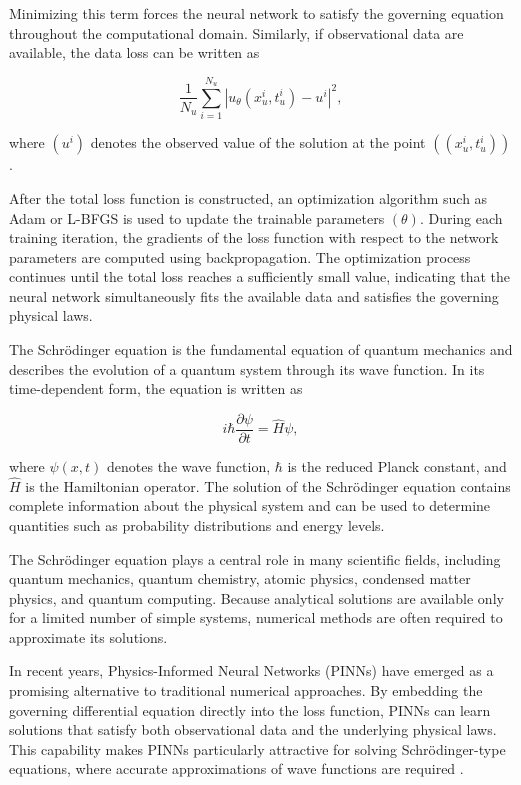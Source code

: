 \documentclass[11pt]{article}
\begin{document}
Minimizing this term forces the neural network to satisfy the 
governing equation throughout the computational domain. Similarly, 
if observational data are available, the data loss can be written as


\begin{equation}
	\frac{1}{N_u}
	\sum_{i=1}^{N_u}
	\left|
	u_\theta(x_u^i,t_u^i)-u^i
	\right|^2,
\end{equation}

where $(u^i)$ denotes the observed value of the solution at the point $((x_u^i,t_u^i))$.


After the total loss function is constructed, an optimization algorithm such 
as Adam or L-BFGS is used to update the trainable parameters $(\theta)$. 
During each training iteration, the gradients of the loss function with 
respect to the network parameters are computed using backpropagation. 
The optimization process continues until the total loss reaches a sufficiently 
small value, indicating that the neural network simultaneously fits the available 
data and satisfies the governing physical laws.


The Schrödinger equation is the fundamental equation of quantum mechanics and 
describes the evolution of a quantum system through its wave function. In its 
time-dependent form, the equation is written as

\begin{equation}
	i\hbar \frac{\partial \psi}{\partial t}
	=
	\hat{H}\psi,
\end{equation}

where $\psi(x,t)$ denotes the wave function, $\hbar$ is the reduced 
Planck constant, and $\hat{H}$ is the Hamiltonian operator. 
The solution of the Schrödinger equation contains complete 
information about the physical system and can be used to 
determine quantities such as probability distributions and energy levels.

The Schrödinger equation plays a central role in many 
scientific fields, including quantum mechanics, 
quantum chemistry, atomic physics, 
condensed matter physics, and quantum computing. 
Because analytical solutions are available only for a 
limited number of simple systems, numerical methods are 
often required to approximate its solutions.

In recent years, Physics-Informed Neural Networks (PINNs) 
have emerged as a promising alternative to traditional numerical 
approaches. By embedding the governing differential 
equation directly into the loss function, PINNs can learn 
solutions that satisfy both observational data and the 
underlying physical laws. This capability makes PINNs particularly
attractive for solving Schrödinger-type equations, where accurate 
approximations of wave functions are required \cite{wangDatadrivenRogueWaves2021}. 
\end{document}
